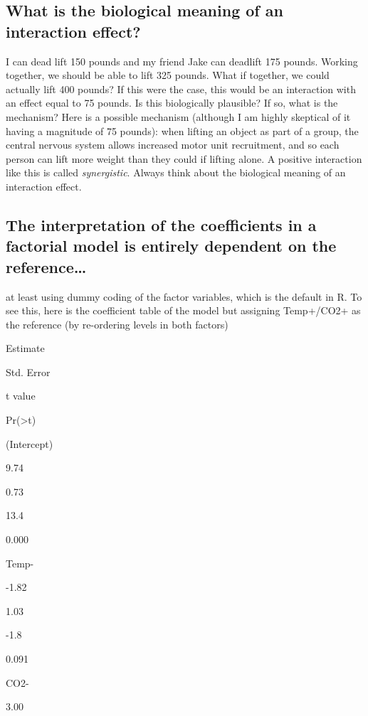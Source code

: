\documentclass[]{book}
\begin{document}
\subsection{What is the biological meaning of an interaction
effect?}\label{what-is-the-biological-meaning-of-an-interaction-effect}

I can dead lift 150 pounds and my friend Jake can deadlift 175 pounds.
Working together, we should be able to lift 325 pounds. What if
together, we could actually lift 400 pounds? If this were the case, this
would be an interaction with an effect equal to 75 pounds. Is this
biologically plausible? If so, what is the mechanism? Here is a possible
mechanism (although I am highly skeptical of it having a magnitude of 75
pounds): when lifting an object as part of a group, the central nervous
system allows increased motor unit recruitment, and so each person can
lift more weight than they could if lifting alone. A positive
interaction like this is called \emph{synergistic}. Always think about
the biological meaning of an interaction effect.

\subsection{The interpretation of the coefficients in a factorial model
is entirely dependent on the
reference\ldots{}}\label{the-interpretation-of-the-coefficients-in-a-factorial-model-is-entirely-dependent-on-the-reference}

at least using dummy coding of the factor variables, which is the
default in R. To see this, here is the coefficient table of the model
but assigning Temp+/CO2+ as the reference (by re-ordering levels in both
factors)

Estimate

Std. Error

t value

Pr(\textgreater{}\textbar{}t\textbar{})

(Intercept)

9.74

0.73

13.4

0.000

Temp-

-1.82

1.03

-1.8

0.091

CO2-

3.00
\end{document}

